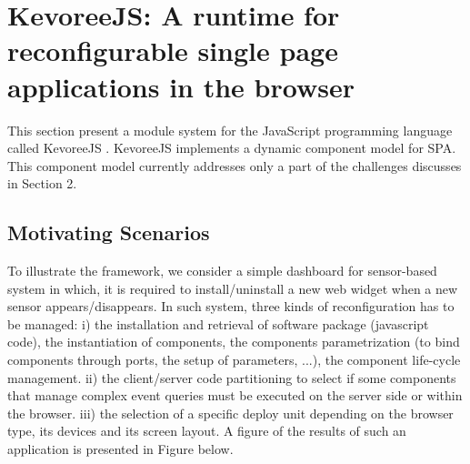 \section{KevoreeJS: A runtime for reconfigurable single page applications in the browser}

This section present a module system for the JavaScript programming language called KevoreeJS . 
KevoreeJS implements a dynamic component model for SPA. 
This component model currently addresses only a part of the challenges discusses in Section 2.   

\subsection{Motivating Scenarios }
To illustrate the framework, we consider a simple dashboard for sensor-based system in which, it is required to install/uninstall a new web widget when a new sensor appears/disappears. In such system, three kinds of reconfiguration has to be managed: i) the installation and retrieval of software package (javascript code), the instantiation of components, the components parametrization (to bind components through ports, the setup of parameters, ...), the component life-cycle management. ii)  the client/server code partitioning to select if some components that manage complex event queries must be executed on the server side or within the browser. iii) the selection of a specific  deploy unit depending on the browser type, its devices and its screen layout. A figure of the results of such an application is presented in Figure below.  


